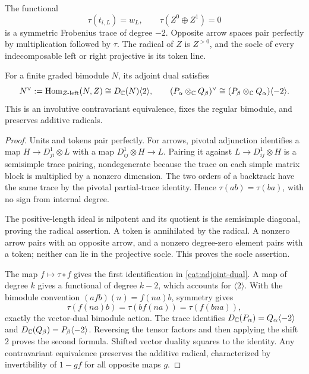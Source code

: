 \begin{lemma}
\label{cat:frobenius}
The functional
\[
 \tau(t_{i,L})=w_L,
 \qquad \tau(Z^0\oplus Z^1)=0
\]
is a symmetric Frobenius trace of degree $-2$.  Opposite arrow
spaces pair perfectly by multiplication followed by $\tau$.  The
radical of $Z$ is $Z^{>0}$, and the socle of every indecomposable
left or right projective is its token line.

For a finite graded bimodule $N$, its adjoint dual satisfies
\begin{equation}
 N^\vee:=\operatorname{Hom}_{Z\text{-left}}(N,Z)
       \cong D_\mathbb C(N)\langle2\rangle,
 \qquad
 (P_\alpha\otimes_\mathbb C Q_\beta)^\vee
       \cong(P_\beta\otimes_\mathbb C Q_\alpha)\langle-2\rangle.
 \label{cat:adjoint-dual}
\end{equation}
This is an involutive contravariant equivalence, fixes the regular
bimodule, and preserves additive radicals.
\end{lemma}

\begin{proof}
Units and tokens pair perfectly.  For arrows, pivotal adjunction
identifies a map $H\to D^1_{ji}\otimes L$ with a map
$D^1_{ij}\otimes H\to L$.  Pairing it against
$L\to D^1_{ij}\otimes H$ is a semisimple trace pairing, nondegenerate
because the trace on each simple matrix block is multiplied by a
nonzero dimension.  The two orders of a backtrack have the same
trace by the pivotal partial-trace identity.  Hence
$\tau(ab)=\tau(ba)$, with no sign from internal degree.

The positive-length ideal is nilpotent and its quotient is the
semisimple diagonal, proving the radical assertion.  A token is
annihilated by the radical.  A nonzero arrow pairs with an opposite
arrow, and a nonzero degree-zero element pairs with a token; neither
can lie in the projective socle.  This proves the socle assertion.

The map $f\mapsto\tau\circ f$ gives the first identification in
\eqref{cat:adjoint-dual}.  A map of degree $k$ gives a functional
of degree $k-2$, which accounts for $\langle2\rangle$.  With the
bimodule convention $(a f b)(n)=f(na)b$, symmetry gives
\[
 \tau(f(na)b)=\tau(bf(na))=\tau(f(bna)),
\]
exactly the vector-dual bimodule action.  The trace identifies
$D_\mathbb C(P_\alpha)=Q_\alpha\langle-2\rangle$ and
$D_\mathbb C(Q_\beta)=P_\beta\langle-2\rangle$.  Reversing the tensor
factors and then applying the shift $2$ proves the second formula.
Shifted vector duality squares to the identity.  Any contravariant
equivalence preserves the additive radical, characterized by
invertibility of $1-gf$ for all opposite maps $g$.
\end{proof}

